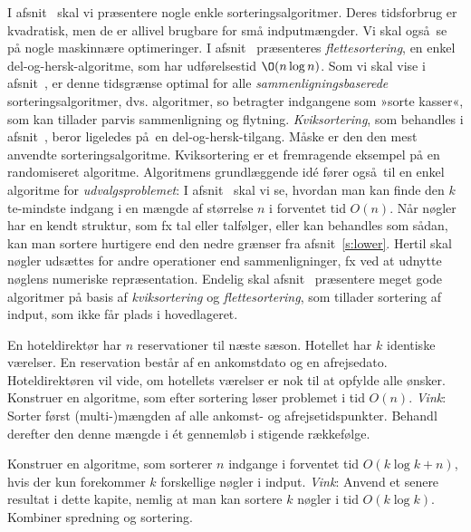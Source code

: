 I afsnit~ skal vi præsentere nogle enkle sorteringsalgoritmer.
Deres tidsforbrug er kvadratisk, men de er allivel brugbare for små indputmængder.
Vi skal også se på nogle maskinnære optimeringer.
I afsnit~ præsenteres \emph{flettesortering}, en enkel del-og-hersk-algoritme, som har udførelsestid $\O(n\log n)$.
Som vi skal vise i afsnit~, er denne tidsgrænse optimal for alle \emph{sammenligningsbaserede} sorteringsalgoritmer, dvs. algoritmer, so betragter indgangene som »sorte kasser«, som kan tillader parvis sammenligning og flytning.
\emph{Kviksortering}, som behandles i  afsnit~, beror ligeledes på en del-og-hersk-tilgang.
Måske er den den mest anvendte sorteringsalgoritme.
Kviksortering er et fremragende eksempel på en randomiseret algoritme.
Algoritmens grundlæggende idé fører også til en enkel algoritme for \emph{udvalgsproblemet}:
I afsnit~ skal vi se, hvordan man kan finde den $k$te-mindste indgang i en mængde af størrelse $n$ i forventet tid $O(n)$.
Når nøgler har en kendt struktur, som fx tal eller talfølger, eller kan behandles som sådan, kan man sortere hurtigere end den nedre grænser fra afsnit~\ref{s:lower}.
Hertil skal nøgler udsættes for andre operationer end sammenligninger, fx ved at udnytte nøglens numeriske repræsentation.
Endelig skal afsnit~ præsentere meget gode algoritmer på basis af \emph{kviksortering} og \emph{flettesortering}, som tillader sortering af indput, som ikke får plads i hovedlageret.

\begin{exerc}
  En hoteldirektør har $n$ reservationer til næste sæson.
  Hotellet har $k$ identiske værelser.
  En reservation består af en ankomstdato og en afrejsedato.
  Hoteldirektøren vil vide, om hotellets værelser er nok til at opfylde alle ønsker.
  Konstruer en algoritme, som efter sortering løser problemet i tid $O(n)$.
  \emph{Vink}: 
  Sorter først (multi-)mængden af alle ankomst- og afrejsetidspunkter.
  Behandl derefter den denne mængde i ét gennemløb i stigende rækkefølge.
\end{exerc}


\begin{exerc}
  Konstruer en algoritme, som sorterer $n$ indgange i forventet tid $O(k\log k + n)$, hvis der kun forekommer $k$ forskellige nøgler i indput.
  \emph{Vink}: 
  Anvend et senere resultat i dette kapite, nemlig at man kan sortere $k$ nøgler i tid $O(k\log k)$. 
  Kombiner spredning og sortering.
\end{exerc}


